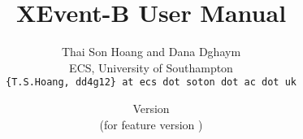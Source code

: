 \documentclass[a4paper,10pt]{article}
\title{XEvent-B User Manual}
\author{%
  Thai Son Hoang and Dana Dghaym\\%
  ECS, University of Southampton\\%
  \texttt{\{T.S.Hoang, dd4g12\} at ecs dot soton dot ac dot uk}%
}%
\date{%
  Version \XEventBManualVersion\\%
  (for feature version \XEventBFeatureVersion)\\
  \ifplastex
  \XEventBManualDate
  \else
  \displaydate{XEventBManualDate}%
  \fi
}
\begin{document}
\ifplastex%
\maketitle%
\else%
 \ifstandalone%
 \maketitle %
 \else%
 \fi%
\fi%











%


\end{document}
